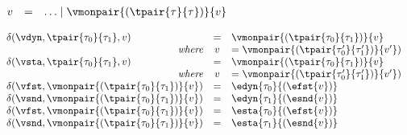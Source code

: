 {\flushleft
$\begin{array}{l c l}
  v & = & \ldots \mid \vmonpair{(\tpair{\tau}{\tau})}{v}
\end{array}$

\medskip
{}
$\begin{array}{l c l}
  \delta(\vdyn, \tpair{\tau_0}{\tau_1}, v) & = & \vmonpair{(\tpair{\tau_0}{\tau_1})}{v}
\\\hfill\emph{where} & v & = \vmonpair{(\tpair{\tau_0'}{\tau_1'})}{v'})
\\
  \delta(\vsta, \tpair{\tau_0}{\tau_1}, v) & = & \vmonpair{(\tpair{\tau_0}{\tau_1})}{v}
\\\hfill\emph{where} & v & = \vmonpair{(\tpair{\tau_0'}{\tau_1'})}{v'})
\\
  \delta(\vfst, \vmonpair{(\tpair{\tau_0}{\tau_1})}{v}) & = & \edyn{\tau_0}{(\efst{v})}
\\
  \delta(\vsnd, \vmonpair{(\tpair{\tau_0}{\tau_1})}{v}) & = & \edyn{\tau_1}{(\esnd{v})}
\\
  \delta(\vfst, \vmonpair{(\tpair{\tau_0}{\tau_1})}{v}) & = & \esta{\tau_0}{(\efst{v})}
\\
  \delta(\vsnd, \vmonpair{(\tpair{\tau_0}{\tau_1})}{v}) & = & \esta{\tau_1}{(\esnd{v})}
\end{array}$

\medskip
\begin{minipage}{0.5\columnwidth}
\begin{mathpar}
\end{mathpar}
\end{minipage}%
\begin{minipage}{0.5\columnwidth}
\begin{mathpar}
\end{mathpar}
\end{minipage}

}

